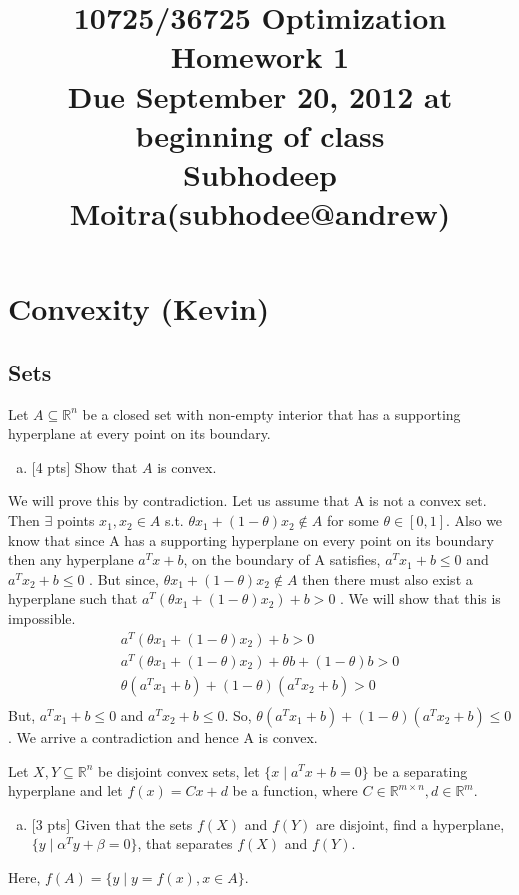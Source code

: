 \documentclass[12pt]{article}
\title{10725/36725 Optimization \\Homework 1\\
{\small Due September 20, 2012 at beginning of class} \\
{Subhodeep Moitra(subhodee@andrew)}
}
\date{}
\begin{document}
\maketitle


\newpage
\clearpage

\section{Convexity (Kevin)}

\subsection{Sets}

Let $A\subseteq\mathbb{R}^n$ be a closed set with non-empty interior that has a supporting hyperplane at every point on its boundary.
\begin{enumerate}[(a)]
\item $[$4 pts$]$ 
Show that $A$ is convex.
\end{enumerate}

We will prove this by contradiction. Let us assume that A is not a convex set. Then $\exists$ points $x_1 , x_2 \in A$ s.t. $\theta x_1 + (1-\theta) x_2 \notin A$ for some $\theta \in [0,1]$. Also we know that since A has a supporting hyperplane on every point on its boundary then any hyperplane $a^Tx+b$, on the boundary of A satisfies, $a^Tx_1+b\leq 0$ and $a^Tx_2+b\leq 0$ . But since, $\theta x_1 + (1-\theta) x_2 \notin A$ then there must also exist a hyperplane such that $a^T(\theta x_1 + (1-\theta) x_2)+b > 0$ . We will show that this is impossible. 
\begin{align*}
a^T(\theta x_1 + (1-\theta) x_2)+b > 0 \\
a^T(\theta x_1 + (1-\theta) x_2)+\theta b + (1-\theta)b > 0\\
\theta(a^T x_1+b) + (1-\theta)(a^T x_2+b)  > 0 \\
\end{align*}
But, $ a^Tx_1+b\leq 0$ and $a^Tx_2+b\leq 0$. So, $\theta(a^T x_1+b) + (1-\theta)(a^T x_2+b) \leq 0 $. We arrive a contradiction and hence A is convex.

\vspace{.25cm}

\noindent Let $X,Y\subseteq\mathbb{R}^n$ be disjoint convex sets, let $\{x \mid a^Tx + b = 0\}$ be a separating hyperplane and let $f(x) = Cx + d$ be a function, where $C\in\mathbb{R}^{m\times n},d\in\mathbb{R}^m$.
\begin{enumerate}[(b)]
\item
$[$3 pts$]$ Given that the sets $f(X)$ and $f(Y)$ are disjoint, find a hyperplane, $\{ y \mid \alpha^Ty + \beta = 0 \}$, that separates $f(X)$ and $f(Y)$.
\end{enumerate}
Here, $f(A) = \{ y \mid y = f(x), x\in A\}$.
\end{document}

